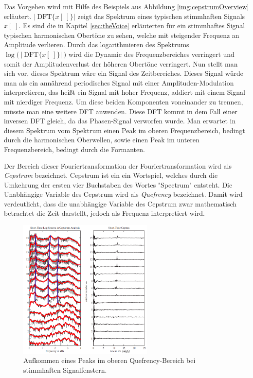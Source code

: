 Das Vorgehen wird mit Hilfe des Beispiels aus Abbildung \ref{img:cepstrumOverview} erläutert. $ |\ \text{DFT}\{x[\;]\} \big| $  zeigt das Spektrum eines \glqq typischen stimmhaften\grqq{} Signals $x[\;]$. Es sind die in Kapitel \ref{sec:theVoice} erläuterten für ein stimmhaftes Signal typischen harmonischen Obertöne zu sehen, welche mit steigender Frequenz an Amplitude verlieren. Durch das logarithmieren des Spektrums $\log \Big(\ \big|\ \text{DFT}\{x[\;]\} \big|\ \Big)$ wird die Dynamic des Frequenzbereiches verringert und somit der Amplitudenverlust der höheren Obertöne verringert. Nun stellt man sich vor, dieses Spektrum wäre ein Signal des Zeitbereiches. Dieses Signal würde man als ein annährend periodisches Signal mit einer Amplituden-Modulation interpretieren, das heißt ein Signal mit hoher Frequenz, addiert mit einem Signal mit nierdiger Frequenz. Um diese beiden Komponenten voneinander zu trennen, müsste man eine weitere DFT anwenden. Diese DFT kommt in dem Fall einer inversen DFT gleich, da das Phasen-Signal verworfen wurde. Man erwartet in diesem \glqq Spektrum vom Spektrum\grqq{} einen Peak im \glqq oberen Frequenzbereich\grqq , bedingt durch die harmonischen Oberwellen, sowie einen Peak im \glqq unteren Frequenzbereich\grqq, bedingt durch die Formanten.\cite[Cepstral analysis]{ricardo_ceps}

Der Bereich dieser \glqq Fouriertransformation der Fouriertransformation\grqq{} wird als \emph{Cepstrum} bezeichnet. Cepstrum ist ein ein Wortspiel, welches durch die Umkehrung der ersten vier Buchstaben des Wortes "Spectrum" entsteht. Die Unabhängige Variable des Cepstrum wird als \emph{Quefrency} bezeichnet. Damit wird verdeutlicht, dass die unabhängige Variable des Cepstrum zwar mathematisch betrachtet die Zeit darstellt, jedoch als Frequenz interpretiert wird.\cite[S. 7]{ricardo_ceps}

\begin{figure}[h]
	\centering
	\includegraphics[width=0.6\textwidth]{bilder/cepstrum05.png}
	\caption{Aufkommen eines Peaks im oberen Quefrency-Bereich bei stimmhaften Signalfenstern. \cite[Cepstral Analysis, S. 17]{ricardo_ceps}}
	\label{img:cepstrumVoicedPeak}
\end{figure}	

